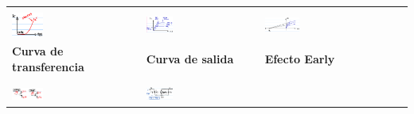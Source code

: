 \documentclass[11pt]{article}
\begin{document}
\begin{table}
	\centering
	\begin{tabular}{|p{}|p{}|p{}|}
		\hline
		                                &                                                                                                                  \\
		\includegraphics[width=0.25\textwidth, keepaspectratio]{transfer}
		                                & \includegraphics[width=0.25\textwidth, keepaspectratio]{output}
		                                & \includegraphics[width=0.25\textwidth, keepaspectratio]{early}                                                   \\
		\textbf{Curva de transferencia} & \textbf{Curva de salida}                                                  & \textbf{Efecto Early}                \\
		                                &                                                                                                                  \\
		\hline
		                                &                                                                                                                  \\
		\includegraphics[width=0.25\textwidth, keepaspectratio]{simbologia}
		                                & \includegraphics[width=0.25\textwidth, keepaspectratio]{smallsignal-npn}

\end{tabular}
\end{table}
\end{document}
